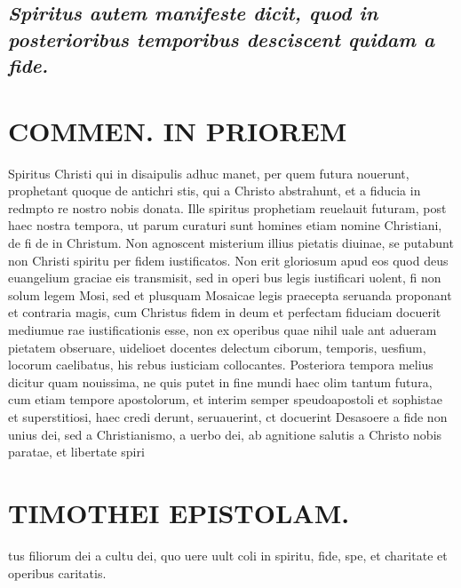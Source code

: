 \documentclass{article}
\begin{document}
\begin{pages}
\subsection*{\textit{\huge\textbf{S}\normalsize piritus autem manifeste dicit, quod in posterioribus temporibus desciscent quidam a fide. }}
\section*{COMMEN. IN PRIOREM }
\marginpar{[ p.94 ]}\pstart Spiritus Christi qui in disaipulis adhuc manet, per quem futura nouerunt, prophetant quoque de antichri stis, qui a Christo abstrahunt, et a fiducia in redmpto re nostro nobis donata. Ille spiritus prophetiam reuelauit futuram, post haec nostra tempora, ut parum curaturi sunt homines etiam nomine Christiani, de fi de in Christum. Non agnoscent misterium illius pietatis diuinae, se putabunt non Christi spiritu per fidem iustificatos. Non erit gloriosum apud eos quod deus euangelium graciae eis transmisit, sed in operi bus legis iustificari uolent, fi non solum legem Mosi, sed et plusquam Mosaicae legis praecepta seruanda proponant et contraria magis, cum Christus fidem in deum et perfectam fiduciam docuerit mediumue rae iustificationis esse, non ex operibus quae nihil uale ant adueram pietatem obseruare, uidelioet docentes delectum ciborum, temporis, uesfium, locorum caelibatus, his rebus iusticiam collocantes. Posteriora tempora melius dicitur quam nouissima, ne quis putet in fine mundi haec olim tantum futura, cum etiam tempore apostolorum, et interim semper speudoapostoli et sophistae et superstitiosi, haec credi derunt, seruauerint, ct docuerint Desasoere a fide non unius dei, sed a Christianismo, a uerbo dei, ab agnitione salutis a Christo nobis paratae, et libertate spiri\pend
\section*{TIMOTHEI EPISTOLAM. }
\marginpar{[ p.95 ]}\pstart tus filiorum dei a cultu dei, quo uere uult coli in spiritu, fide, spe, et charitate et operibus caritatis.  \pend
{}
{}

\end{pages}
\end{document}
